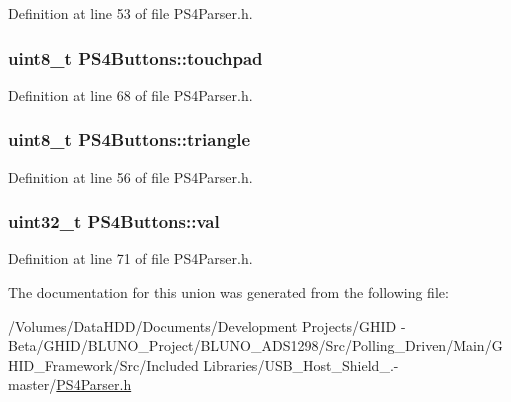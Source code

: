\-Definition at line 53 of file \-P\-S4\-Parser.\-h.

\hypertarget{union_p_s4_buttons_a785305478e29a078003c360babb50ab0}{
\subsubsection[{touchpad}]{\setlength{\rightskip}{0pt plus 5cm}uint8\-\_\-t {\bf \-P\-S4\-Buttons\-::touchpad}}}\label{union_p_s4_buttons_a785305478e29a078003c360babb50ab0}


\-Definition at line 68 of file \-P\-S4\-Parser.\-h.

\hypertarget{union_p_s4_buttons_a72d07e9a47b1b75474e152b6aaeae6e5}{
\subsubsection[{triangle}]{\setlength{\rightskip}{0pt plus 5cm}uint8\-\_\-t {\bf \-P\-S4\-Buttons\-::triangle}}}\label{union_p_s4_buttons_a72d07e9a47b1b75474e152b6aaeae6e5}


\-Definition at line 56 of file \-P\-S4\-Parser.\-h.

\hypertarget{union_p_s4_buttons_aa381b471d6e5f1e36fa87048b0f8ddc9}{
\subsubsection[{val}]{\setlength{\rightskip}{0pt plus 5cm}uint32\-\_\-t {\bf \-P\-S4\-Buttons\-::val}}}\label{union_p_s4_buttons_aa381b471d6e5f1e36fa87048b0f8ddc9}


\-Definition at line 71 of file \-P\-S4\-Parser.\-h.



\-The documentation for this union was generated from the following file\-:\begin{DoxyCompactItemize}
\item 
/\-Volumes/\-Data\-H\-D\-D/\-Documents/\-Development Projects/\-G\-H\-I\-D -\/ Beta/\-G\-H\-I\-D/\-B\-L\-U\-N\-O\-\_\-\-Project/\-B\-L\-U\-N\-O\-\_\-\-A\-D\-S1298/\-Src/\-Polling\-\_\-\-Driven/\-Main/\-G\-H\-I\-D\-\_\-\-Framework/\-Src/\-Included Libraries/\-U\-S\-B\-\_\-\-Host\-\_\-\-Shield\-\_.-\/master/\hyperlink{_p_s4_parser_8h}{\-P\-S4\-Parser.\-h}\end{DoxyCompactItemize}
